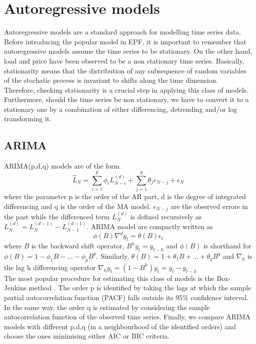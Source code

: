 \section{Autoregressive models}
Autoregressive models are a standard approach for modelling time series data.
Before introducing the popular model in EPF, it is important to remember that autoregressive models assume the time series to be stationary. On the other hand, load and price have been observed to be a non stationary time series. 
Basically, stationarity means that the distribution of any subsequence of random variables of the stochatic process is invariant to shifts along the time dimension.
\\
Therefore, checking stationarity is a crucial step in applying this class of models. %
Furthermore, should the time series be non stationary, we have to convert it to a stationary one by a combination of either differencing, detrending and/or log transforming it.
\subsection{ARIMA}
ARIMA(p,d,q) models are of the form
\begin{equation}
    \hat{L}_N=\sum\limits_{i=1}^{p}\phi_i L_{N-i}^{(d)}+\sum\limits_{j=1}^{q}\theta_j \epsilon_{N-j}+\epsilon_N
\end{equation}
where the parameter p is the order of the AR part, d is the degree of integrated differencing and q is the order of the MA model. $\epsilon_{N-j}$ are the observed errors in the past while the differenced term $L_N^{(d)}$ is defined recursively as $L_N^{(d)}=L_N^{(d-1)}-L_{N-1}^{(d-1)}$.
ARIMA model are compactly written as
\begin{equation}
    \phi(B)\nabla^d y_t=\theta(B)\epsilon_t
\end{equation}
where $B$ is the backward shift operator, $B^h y_t=y_{t-h}$ and $\phi(B)$ is shorthand for $\phi(B)=1-\phi_1B-\dots-\phi_p B^p$.
Similarly, $\theta(B)=1+\theta_1B+\dots+\theta_q B^q$ and $\nabla_h$ is the lag h differencing operator $\nabla_h y_t=(1-B^h)y_t=y_t-y_{t-h}$
\\
The most popular procedure for estimating this class of models is the Box-Jenkins method \cite{box2015time}.
The order p is identified by taking the lags at which the sample partial autocorrelation function (PACF) falls outside its 95\% confidence interval.
In the same way, the order q is estimated by considering the sample autocorrelation function of the observed time series. Finally, we compare ARIMA models with different p,d,q (in a neighbourhood of the identified orders) and choose the ones minimising either AIC or BIC criteria. 

